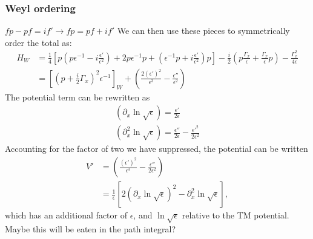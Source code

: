 \subsubsection{Weyl ordering}

$fp-pf = if'\rightarrow fp = pf+if'$
We can then use these pieces to symmetrically order the total as: 
\begin{align}
H_W&=\frac{1}{4}\left[p(p\epsilon^{-1}-i\frac{\epsilon'}{\epsilon^2})+ 2p\epsilon^{-1}p +
  (\epsilon^{-1}p+i\frac{\epsilon'}{\epsilon^2})p\right]
-\frac{i}{2}\left(p\frac{\Gamma_x}{\epsilon}+\frac{\Gamma_x}{\epsilon}p\right)
-\frac{\Gamma_x^2}{4\epsilon}\\
&=[(p+\frac{i}{2}\Gamma_x)^2\epsilon^{-1}]_W 
+\left(\frac{2(\epsilon')^2}{\epsilon^3}-\frac{\epsilon''}{\epsilon^2}\right)
\end{align}
The potential term can be rewritten as
\begin{align}
  (\partial_x\ln\sqrt{\epsilon}) = \frac{\epsilon'}{2\epsilon}\\
  (\partial_x^2\ln\sqrt{\epsilon}) = \frac{\epsilon''}{2\epsilon}-\frac{\epsilon'^2}{2\epsilon^2}
\end{align}
Accounting for the factor of two we have suppressed, the potential can be written
\begin{align}
 V'&= \left(\frac{(\epsilon')^2}{\epsilon^3}-\frac{\epsilon''}{2\epsilon^2}\right)\\
 &=\frac{1}{\epsilon}\left[2(\partial_x\ln\sqrt{\epsilon})^2-\partial_x^2\ln\sqrt{\epsilon}\right],
\end{align}
which has an additional factor of $\epsilon$, and $\ln\sqrt{\epsilon}$ relative to the
TM potential.  Maybe this will be eaten in the path integral? 

